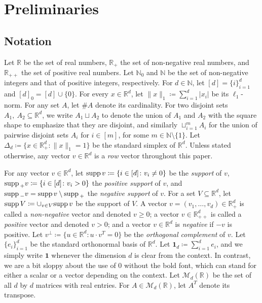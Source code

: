 \documentclass[10pt]{amsart}
\numberwithin{equation}{section}
\theoremstyle{plain}
\theoremstyle{definition}
\theoremstyle{remark}
\newcommand{\supp}{{\rm supp\,}}
\begin{document}
\section{Preliminaries}
\subsection{Notation}

Let $\mathbb{R}$ be the set of real numbers, $\mathbb{R}_+$ the set of non-negative real numbers, and $\mathbb{R}_{++}$ the set of positive real numbers. Let $\mathbb{N}_0$ and $\mathbb{N}$ be the set of non-negative integers and that of positive integers, respectively. For $d\in\mathbb{N}$, let $[d]=\{i\}_{i=1}^d$ and $[d]_0=[d]\cup\{0\}$. For every $x\in\mathbb{R}^d$, let $\|x\|_1\coloneqq\sum_{i=1}^d|x_i|$ be its $\ell_1$-norm. For any set $A$, let $\# A$ denote its cardinality. For two disjoint sets $A_1,\ A_2\subseteq\mathbb{R}^d$, we write $A_1\sqcup A_2$ to denote the union of $A_1$ and $A_2$ with the square shape to emphasize that they are disjoint, and similarly $\sqcup_{i=1}^mA_i$ for the union of pairwise disjoint sets $A_i$ for $i\in[m]$, for some $m\in\mathbb{N}\setminus\{1\}$. Let $\Delta_d\coloneqq\{x\in\mathbb{R}^d_+\colon \|x\|_1=1\}$ be the standard simplex of $\mathbb{R}^d$.  Unless stated otherwise, any vector $v\in\mathbb{R}^d$ is a \emph{row} vector throughout this paper.

For any vector $v\in\mathbb{R}^d$, let $\supp v\coloneqq\{i\in[d]\colon v_i\neq0\}$ be the \emph{support} of $v$, $\supp_+ v\coloneqq\{i\in[d]\colon v_i>0\}$ the  \emph{positive support} of $v$, and $\supp_-v=\supp v\setminus\supp_+$ the \emph{negative support} of $v$.
 For a set $V\subseteq\mathbb{R}^d$, let $\supp V\coloneqq\cup_{v\in V}\supp v$ be the support of $V$.  A vector $v=(v_1,\ldots,v_d)\in\mathbb{R}^d_+$ is called a \emph{non-negative} vector  and denoted $v\ge0$; a   vector $v\in\mathbb{R}^d_{++}$ is called a \emph{positive} vector and denoted $v>0$; and a vector $v\in\mathbb{R}^d$ is \emph{negative} if $-v$ is positive.  Let $v^{\perp}\coloneqq\{u\in \mathbb{R}^d\colon u\cdot v^T=0\}$ be the \emph{orthogonal complement} of $v$.  Let $\{e_i\}_{i=1}^d$ be the standard orthonormal basis of $\mathbb{R}^d$.
 Let $\mathbf{1}_d\coloneqq\sum_{i=1}^de_i$, and we simply write $\mathbf{1}$ whenever the dimension $d$ is clear from the context. In contrast, we are a bit sloppy about the use of $0$ without the bold font, which can stand for either a scalar or a vector depending on the context.  Let $\mathcal{M}_d(\mathbb{R})$ be the set of all $d$ by $d$ matrices with real entries. For $A\in\mathcal{M}_d(\mathbb{R})$, let $A^T$ denote its transpose.
\end{document}
